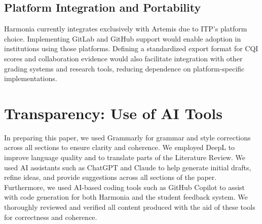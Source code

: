 \documentclass[sigconf]{acmart}
\begin{document}
\subsection{Platform Integration and Portability}

Harmonia currently integrates exclusively with Artemis due to ITP's platform choice. Implementing GitLab and GitHub support would enable adoption in institutions using those platforms. Defining a standardized export format for CQI scores and collaboration evidence would also facilitate integration with other grading systems and research tools, reducing dependence on platform-specific implementations.

\section*{Transparency: Use of AI Tools}
In preparing this paper, we used Grammarly for grammar and style corrections across all sections to ensure clarity and coherence. We employed DeepL to improve language quality and to translate parts of the Literature Review. We used AI assistants such as ChatGPT and Claude to help generate initial drafts, refine ideas, and provide suggestions across all sections of the paper. Furthermore, we used AI-based coding tools such as GitHub Copilot to assist with code generation for both Harmonia and the student feedback system. We thoroughly reviewed and verified all content produced with the aid of these tools for correctness and coherence.



\end{document}
